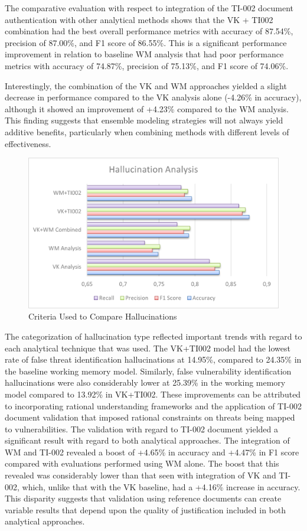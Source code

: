 \documentclass[sigconf]{acmart}
\begin{document}
The comparative evaluation with respect to integration of the TI-002 document authentication with other analytical methods shows that the VK + TI002 combination had the best overall performance metrics with accuracy of 87.54\%, precision of 87.00\%, and F1 score of 86.55\%. This is a significant performance improvement in relation to baseline WM analysis that had poor performance metrics with accuracy of 74.87\%, precision of 75.13\%, and F1 score of 74.06\%.

Interestingly, the combination of the VK and WM approaches yielded a slight decrease in performance compared to the VK analysis alone (-4.26\% in accuracy), although it showed an improvement of +4.23\% compared to the WM analysis. This finding suggests that ensemble modeling strategies will not always yield additive benefits, particularly when combining methods with different levels of effectiveness.

\begin{figure}
    \centering
    \includegraphics[width=0.5\linewidth]{hallucination.png}
    \caption{Criteria Used to Compare Hallucinations}
    \label{fig:enter-label}
\end{figure}

The categorization of hallucination type reflected important trends with regard to each analytical technique that was used. The VK+TI002 model had the lowest rate of false threat identification hallucinations at 14.95\%, compared to 24.35\% in the baseline working memory model. Similarly, false vulnerability identification hallucinations were also considerably lower at 25.39\% in the working memory model compared to 13.92\% in VK+TI002. These improvements can be attributed to incorporating rational understanding frameworks and the application of TI-002 document validation that imposed rational constraints on threats being mapped to vulnerabilities.
The validation with regard to TI-002 document yielded a significant result with regard to both analytical approaches. The integration of WM and TI-002 revealed a boost of +4.65\% in accuracy and +4.47\% in F1 score compared with evaluations performed using WM alone. The boost that this revealed was considerably lower than that seen with integration of VK and TI-002, which, unlike that with the VK baseline, had a +4.16\% increase in accuracy. This disparity suggests that validation using reference documents can create variable results that depend upon the quality of justification included in both analytical approaches.
\end{document}
